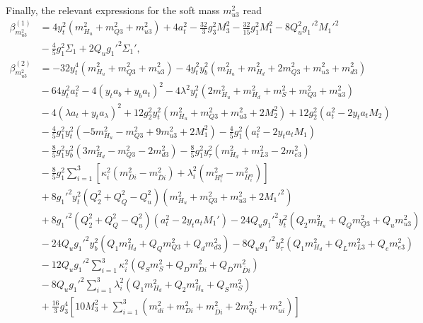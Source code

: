 \documentclass[preprint,amsmath,amssymb,aps,superscriptaddress,prd,showpacs,floatfix,nofootinbib]{revtex4-1}
\begin{document}
Finally, the relevant expressions for the soft mass $m_{u3}^2$ read
\begin{subequations}
\begin{align}
\beta_{m_{u3}^2}^{(1)}&=4y_t^2\left ( m_{H_u}^2+m_{Q3}^2+m_{u3}^2\right )+4a_t^2-\frac{32}{3}g_3^2M_3^2-\frac{32}{15}g_1^2M_1^2-8Q_u^2g_1'^2M_1'^2\nonumber\\
&{}-\frac{4}{5}g_1^2\Sigma_1+2Q_ug_1'^2\Sigma_1',\label{eq:USSMmu222BetaOneLoop}\\
\beta_{m_{u3}^2}^{(2)}&=-32y_t^4\left ( m_{H_u}^2+m_{Q3}^2+m_{u3}^2\right )-4y_t^2y_b^2\left ( m_{H_u}^2+m_{H_d}^2+2m_{Q3}^2+m_{u3}^2+m_{d3}^2\right )\nonumber\\
&{}-64y_t^2a_t^2-4\left ( y_ta_b+y_ba_t\right )^2-4\lambda^2y_t^2\left ( 2m_{H_u}^2+m_{H_d}^2+m_S^2+m_{Q3}^2+m_{u3}^2\right )\nonumber\\
&{}-4\left ( \lambda a_t + y_ta_\lambda \right )^2+12g_2^2y_t^2\left ( m_{H_u}^2+m_{Q3}^2+m_{u3}^2+2M_2^2\right )+12g_2^2\left ( a_t^2-2y_ta_tM_2\right )\nonumber\\
&{}-\frac{4}{5}g_1^2y_t^2\left ( -5m_{H_u}^2-m_{Q3}^2+9m_{u3}^2+2M_1^2\right )-\frac{4}{5}g_1^2\left ( a_t^2-2y_ta_tM_1 \right )\nonumber\\
&{}-\frac{8}{5}g_1^2y_b^2\left ( 3m_{H_d}^2-m_{Q3}^2-2m_{d3}^2\right )-\frac{8}{5}g_1^2y_\tau^2\left ( m_{H_d}^2+m_{L3}^2-2m_{e3}^2\right )\nonumber\\
&{}-\frac{8}{5}g_1^2\sum_{i=1}^3\left [ \kappa_i^2\left ( m_{Di}^2-m_{\overline{D}i}^2 \right )+\lambda_i^2\left ( m_{H_i^d}^2-m_{H_i^u}^2 \right )\right ]\nonumber\\
&{}+8g_1'^2y_t^2\left ( Q_2^2+Q_Q^2-Q_u^2\right )\left ( m_{H_u}^2+m_{Q3}^2+m_{u3}^2+2M_1'^2\right )\nonumber\\
&{}+8g_1'^2\left ( Q_2^2+Q_Q^2-Q_u^2\right )\left ( a_t^2-2y_ta_tM_1'\right )-24Q_ug_1'^2y_t^2\left (Q_2m_{H_u}^2+Q_Qm_{Q3}^2+Q_um_{u3}^2\right )\nonumber\\
&{}-24Q_ug_1'^2y_b^2\left ( Q_1m_{H_d}^2+Q_Qm_{Q3}^2+Q_dm_{d3}^2\right )-8Q_ug_1'^2y_\tau^2\left ( Q_1m_{H_d}^2+Q_Lm_{L3}^2+Q_em_{e3}^2\right )\nonumber\\
&{}-12Q_ug_1'^2\sum_{i=1}^3\kappa_i^2\left ( Q_Sm_S^2+Q_Dm_{Di}^2+Q_{\overline{D}}m_{\overline{D}i}^2\right )\nonumber\\
&{}-8Q_ug_1'^2\sum_{i=1}^3\lambda_i^2\left ( Q_1m_{H_d}^2+Q_2m_{H_u}^2+Q_Sm_S^2\right )\nonumber\\
&{}+\frac{16}{3}g_3^4\left [ 10M_3^2+\sum_{i=1}^3\left ( m_{di}^2+m_{Di}^2+m_{\overline{D}i}^2+2m_{Qi}^2+m_{ui}^2\right )\right ]\nonumber\\

\end{align}
\end{subequations}
\end{document}
